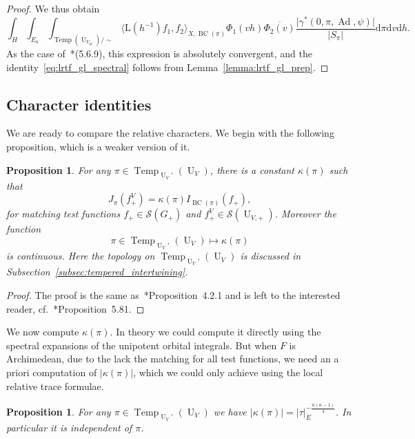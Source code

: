 \documentclass[letterpaper,11pt]{amsart}
\newcommand{\cS}{\mathcal{S}}
\newcommand{\rd}{\mathrm{d}}
\newcommand{\<}{\negthickspace}
\providecommand{\abs}[1]{\lvert#1\rvert}
\DeclareMathOperator{\U}{U}
\DeclareMathOperator{\BC}{BC}
\DeclareMathOperator{\Ad}{Ad}
\DeclareMathOperator{\Temp}{Temp} \DeclareMathOperator{\temp}{temp}
\theoremstyle{definition}
\theoremstyle{plain}
\newtheorem{prop}[definition]{Proposition}
\theoremstyle{remark}
\numberwithin{equation}{section}
\begin{document}
\begin{proof}
We thus obtain
    \[
    \int_{H} \int_{E_n}
    \int_{\Temp(\U_{V_{qs}})/\sim}
    \langle \mathrm{L}(h^{-1})f_1, f_2\rangle_{X, \BC(\pi)}
    \Phi_1(v h)
    \overline{\Phi_2(v)}
    \frac{\abs{\gamma^*(0,\pi, \Ad, \psi)}}{\abs{S_{\pi}}}
    \rd \pi \rd v \rd h.
    \]
As the case of~\cite{BP1}*{(5.6.9)}, this expression is absolutely
convergent, and the identity~\eqref{eq:lrtf_gl_spectral} follows from
Lemma~\ref{lemma:lrtf_gl_prep}.
\end{proof}


\subsection{Character identities}
We are ready to compare the relative characters. We begin with the following
proposition, which is a weaker version of it.

\begin{prop}    \label{prop:weak_comparison}
For any $\pi \in \Temp_{\U_V'}(\U_V)$, there is a constant $\kappa(\pi)$ such
that
    \[
    J_{\pi}(f^V_+) = \kappa(\pi) I_{\BC(\pi)}(f_+),
    \]
for matching test functions $f_+ \in \cS(G_+)$ and $f^V_+ \in \cS(\U_{V,
+})$. Moreover the function
    \[
    \pi \in \Temp_{\U_V'}(\U_V) \mapsto \kappa(\pi)
    \]
is continuous. Here the topology on $\Temp_{\U_V'}(\U_V)$ is discussed in
Subsection~\ref{subsec:tempered_intertwining}.
\end{prop}

\begin{proof}
The proof is the same as~\cite{BP}*{Proposition~4.2.1} and is left to the
interested reader, cf.~\cite{BP1}*{Proposition~5.81}.
\end{proof}

We now compute $\kappa(\pi)$. In theory we could compute it directly using
the spectral expansions of the unipotent orbital integrals. But when $F$ is
Archimedean, due to the lack the matching for all test functions, we need an
a priori computation of $\abs{\kappa(\pi)}$, which we could only achieve
using the local relative trace formulae.

\begin{prop}    \label{prop:abs_value_kappa}
For any $\pi \in \Temp_{\U_V'}(\U_V)$ we have $\abs{\kappa(\pi)} =
\abs{\tau}_E^{-\frac{n(n-1)}{4}}$. In particular it is independent of $\pi$.
\end{prop}
\end{document}

